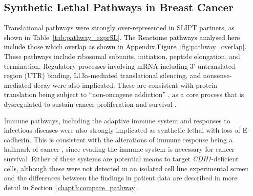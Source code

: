 
\subsection{Synthetic Lethal Pathways in Breast Cancer} \label{chapt3:exprSL_pathways}

Translational \glspl{pathway} were strongly over-represented in \gls{SLIPT} partners, as shown in Table~\ref{tab:pathway_exprSL}. \textcolor{black}{The Reactome pathways analysed here include those which overlap as shown in Appendix Figure~\ref{fig:pathway_overlap}.} These \textcolor{black}{pathways} include ribosomal subunits, initiation, peptide elongation, and termination. Regulatory processes involving \acrshort{mRNA} including 3' untranslated region (UTR) binding, L13a-mediated translational silencing, and nonsense-mediated decay were also implicated. These are consistent with protein translation being subject to ``\gls{non-oncogene addiction}'' \citep{Luo2009}, as a core process that is dysregulated to sustain cancer proliferation and survival \citep{Gao2015}.

Immune \glspl{pathway}, including the adaptive immune system and responses to infectious diseases were also strongly implicated as \gls{synthetic lethal} with loss of \gls{E-cadherin}. This is consistent with the alterations of immune response being a hallmark of cancer \cite{Hanahan2000}, since evading the immune system is necessary for cancer survival. Either of these systems are potential means to target \textit{CDH1}-deficient cells, although these were not detected in an isolated cell line experimental screen \citep{Telford2015} and the differences between the findings in patient data are described in more detail in Section~\ref{chapt3:compare_pathway}.


